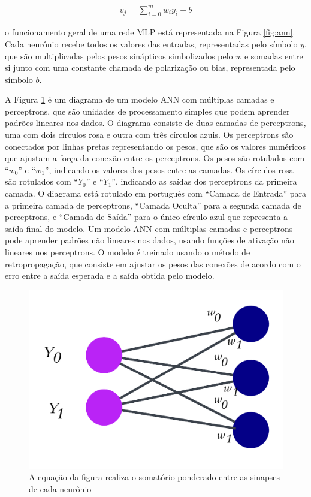  \begin{eqnarray}
 	v_j=\sum_{i=0}^m w_i y_i+b\label{eq:ann}
 \end{eqnarray}
 
 \noindent o funcionamento geral de uma rede MLP está representada na Figura \ref{fig:ann}. Cada neurônio recebe todos os valores das entradas, representadas pelo símbolo $y$, que são multiplicadas pelos pesos sinápticos simbolizados pelo $w$ e somadas entre si junto com uma constante chamada de polarização ou bias, representada pelo símbolo $b$.
 
 A Figura \ref{fig:ann1} é um diagrama de um modelo ANN com múltiplas camadas e perceptrons, que são unidades de processamento simples que podem aprender padrões lineares nos dados.
 O diagrama consiste de duas camadas de perceptrons, uma com dois círculos rosa e outra com três círculos azuis. Os perceptrons são conectados por linhas pretas representando os pesos, que são os valores numéricos que ajustam a força da conexão entre os perceptrons.
 Os pesos são rotulados com ``$w_0$'' e ``$w_1$'', indicando os valores dos pesos entre as camadas. Os círculos rosa são rotulados com ``$Y_0$'' e ``$Y_1$'', indicando as saídas dos perceptrons da primeira camada.
 O diagrama está rotulado em português com ``Camada de Entrada'' para a primeira camada de perceptrons, ``Camada Oculta'' para a segunda camada de perceptrons, e ``Camada de Saída'' para o único círculo azul que representa a saída final do modelo.
 Um modelo ANN com múltiplas camadas e perceptrons pode aprender padrões não lineares nos dados, usando funções de ativação não lineares nos perceptrons. O modelo é treinado usando o método de retropropagação, que consiste em ajustar os pesos das conexões de acordo com o erro entre a saída esperada e a saída obtida pelo modelo.
 
 \begin{figure}[!htb]
 	\centering
 	\caption{A equação da figura realiza o somatório ponderado entre as sinapses de cada neurônio}
 	\includegraphics[width=0.4\linewidth]{Modelos/Figuras/ann1}
 	
 	\label{fig:ann1}
 	
 \end{figure}
 

